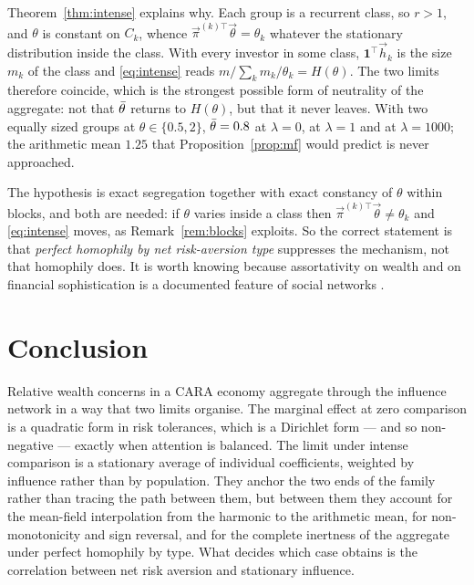 Theorem~\ref{thm:intense} explains why. Each group is a recurrent class, so
$r>1$, and $\theta$ is constant on $C_k$, whence
$\vec\pi^{(k)\top}\vec\theta=\theta_k$ whatever the stationary distribution
inside the class. With every investor in some class, $\mathbf 1^{\top}\vec h_k$
is the size $m_k$ of the class and \eqref{eq:intense} reads
$m/\sum_km_k/\theta_k=H(\theta)$. The two limits therefore coincide, which is
the strongest possible form of neutrality of the aggregate: not that $\bar\theta$
returns to $H(\theta)$, but that it never leaves. With two equally sized groups
at $\theta\in\{0.5,2\}$, $\bar\theta=0.8$ at $\lambda=0$, at $\lambda=1$ and at
$\lambda=1000$; the arithmetic mean $1.25$ that Proposition~\ref{prop:mf} would
predict is never approached.

The hypothesis is exact segregation together with exact constancy of $\theta$
within blocks, and both are needed: if $\theta$ varies inside a class then
$\vec\pi^{(k)\top}\vec\theta\neq\theta_k$ and \eqref{eq:intense} moves, as
Remark~\ref{rem:blocks} exploits. So the correct statement is that
\emph{perfect homophily by net risk-aversion type} suppresses the mechanism, not
that homophily does. It is worth knowing because assortativity on wealth and on
financial sophistication is a documented feature of social networks
\cite{mcpherson,bailey}.


\section{Conclusion}

Relative wealth concerns in a CARA economy aggregate through the influence
network in a way that two limits organise. The marginal effect at
zero comparison is a quadratic form in risk tolerances, which is a Dirichlet
form --- and so non-negative --- exactly when attention is balanced. The limit
under intense comparison is a stationary average of individual coefficients,
weighted by influence rather than by population. They anchor the two ends of the family rather than tracing the path between
them, but between them they account for the mean-field interpolation from the
harmonic to the arithmetic mean, for non-monotonicity and sign reversal, and
for the complete inertness of the aggregate under perfect homophily by type. What decides which
case obtains is the correlation between net risk aversion and stationary
influence.


